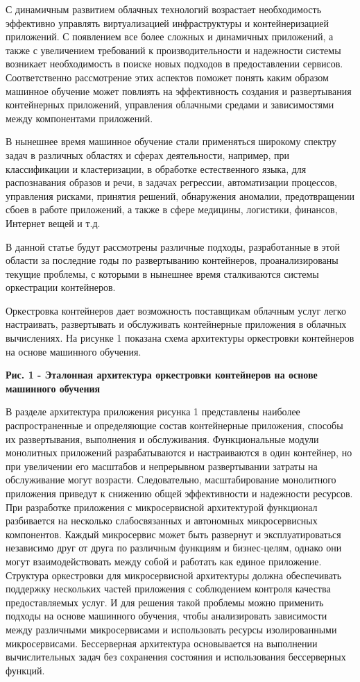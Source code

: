 С динамичным развитием облачных технологий возрастает необходимость
эффективно управлять виртуализацией инфраструктуры и контейнеризацией
приложений. С появлением все более сложных и динамичных приложений, а
также с увеличением требований к производительности и надежности системы
возникает необходимость в поиске новых подходов в предоставлении
сервисов. Соответственно рассмотрение этих аспектов поможет понять каким
образом машинное обучение может повлиять на эффективность создания и
развертывания контейнерных приложений, управления облачными средами и
зависимостями между компонентами приложений.

В нынешнее время машинное обучение стали применяться широкому спектру
задач в различных областях и сферах деятельности, например, при
классификации и кластеризации, в обработке естественного языка, для
распознавания образов и речи, в задачах регрессии, автоматизации
процессов, управления рисками, принятия решений, обнаружения аномалии,
предотвращении сбоев в работе приложений, а также в сфере медицины,
логистики, финансов, Интернет вещей и т.д.

В данной статье будут рассмотрены различные подходы, разработанные в
этой области за последние годы по развертыванию контейнеров,
проанализированы текущие проблемы, с которыми в нынешнее время
сталкиваются системы оркестрации контейнеров.

Оркестровка контейнеров дает возможность поставщикам облачным услуг
легко настраивать, развертывать и обслуживать контейнерные приложения в
облачных вычислениях. На рисунке 1 показана схема архитектуры
оркестровки контейнеров на основе машинного обучения.

\textbf{Рис. 1 - Эталонная архитектура оркестровки контейнеров на основе
машинного обучения}

В разделе архитектура приложения рисунка 1 представлены наиболее
распространенные и определяющие состав контейнерные приложения, способы
их развертывания, выполнения и обслуживания. Функциональные модули
монолитных приложений разрабатываются и настраиваются в один контейнер,
но при увеличении его масштабов и непрерывном развертывании затраты на
обслуживание могут возрасти. Следовательно, масштабирование монолитного
приложения приведут к снижению общей эффективности и надежности
ресурсов. При разработке приложения с микросервисной архитектурой
функционал разбивается на несколько слабосвязанных и автономных
микросервисных компонентов. Каждый микросервис может быть развернут и
эксплуатироваться независимо друг от друга по различным функциям и
бизнес-целям, однако они могут взаимодействовать между собой и работать
как единое приложение. Структура оркестровки для микросервисной
архитектуры должна обеспечивать поддержку нескольких частей приложения с
соблюдением контроля качества предоставляемых услуг. И для решения такой
проблемы можно применить подходы на основе машинного обучения, чтобы
анализировать зависимости между различными микросервисами и использовать
ресурсы изолированными микросервисами. Бессерверная архитектура
основывается на выполнении вычислительных задач без сохранения состояния
и использования бессерверных функций.

